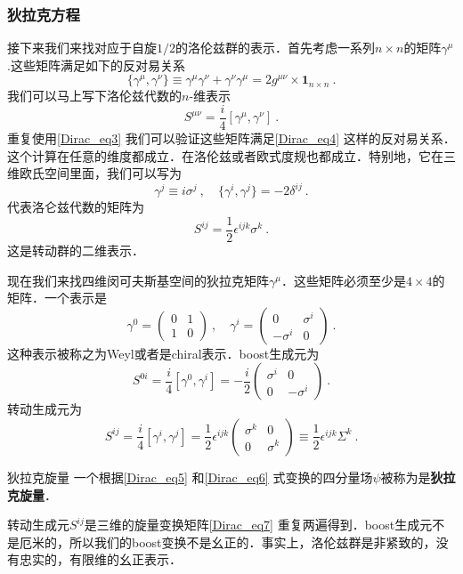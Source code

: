 \subsubsection{狄拉克方程}
接下来我们来找对应于自旋$1/2$的洛伦兹群的表示．首先考虑一系列$n\times n$的矩阵$\gamma^\mu$.这些矩阵满足如下的反对易关系
\begin{equation}\label{Dirac_eq3}
\{\gamma^\mu,\gamma^\nu\}\equiv\gamma^\mu\gamma^\nu+\gamma^\nu\gamma^\mu = 2 g^{\mu\nu} \times \boldsymbol{1}_{n\times n}~.
\end{equation}
我们可以马上写下洛伦兹代数的$n$-维表示
\begin{equation}
S^{\mu\nu} = \frac{i}{4}[\gamma^\mu,\gamma^\nu]~.
\end{equation}
重复使用\autoref{Dirac_eq3} 我们可以验证这些矩阵满足\autoref{Dirac_eq4} 这样的反对易关系．这个计算在任意的维度都成立．在洛伦兹或者欧式度规也都成立．特别地，它在三维欧氏空间里面，我们可以写为
\begin{equation}
\gamma^j \equiv i \sigma^j~,\quad \{\gamma^i,\gamma^j\} = - 2 \delta^{ij} ~.
\end{equation}
代表洛仑兹代数的矩阵为
\begin{equation}\label{Dirac_eq7}
S^{ij} = \frac{1}{2} \epsilon^{ijk} \sigma^k~.
\end{equation}
这是转动群的二维表示．

现在我们来找四维闵可夫斯基空间的狄拉克矩阵$\gamma^\mu$．这些矩阵必须至少是$4\times 4$的矩阵．一个表示是
\begin{equation}
\gamma^0 = \begin{pmatrix}
0 & 1 \\ 1 & 0
\end{pmatrix}~,\quad \gamma^i = \begin{pmatrix}
0 & \sigma^i \\
-\sigma^i & 0 
\end{pmatrix}~.
\end{equation}
这种表示被称之为Weyl或者是chiral表示．boost生成元为
\begin{equation}\label{Dirac_eq5}
S^{0i} = \frac{i}{4}[\gamma^0,\gamma^i]=-\frac{i}{2}\begin{pmatrix}
\sigma^i & 0 \\
0 & -\sigma^i 
\end{pmatrix}~.
\end{equation}
转动生成元为
\begin{equation}\label{Dirac_eq6}
S^{ij} = \frac{i}{4}[\gamma^i,\gamma^j] = \frac{1}{2} \epsilon^{ijk} \begin{pmatrix}
\sigma^k & 0 \\ 
0 & \sigma^k 
\end{pmatrix}\equiv \frac{1}{2} \epsilon^{ijk} \Sigma^k~.
\end{equation}
\begin{definition}{狄拉克旋量}
一个根据\autoref{Dirac_eq5} 和\autoref{Dirac_eq6} 
式变换的四分量场$\psi$被称为是\textbf{狄拉克旋量}．
\end{definition}
转动生成元$S^{ij}$是三维的旋量变换矩阵\autoref{Dirac_eq7} 重复两遍得到．boost生成元不是厄米的，所以我们的boost变换不是幺正的．事实上，洛伦兹群是非紧致的，没有忠实的，有限维的幺正表示．

